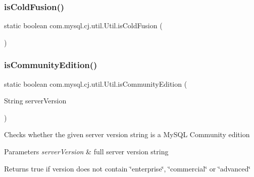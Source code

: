 \subsubsection{\texorpdfstring{is\+Cold\+Fusion()}{isColdFusion()}}
{\footnotesize\ttfamily static boolean com.\+mysql.\+cj.\+util.\+Util.\+is\+Cold\+Fusion (\begin{DoxyParamCaption}{ }\end{DoxyParamCaption})\hspace{0.3cm}{\ttfamily [static]}}

\mbox{\label{classcom_1_1mysql_1_1cj_1_1util_1_1_util_ae6f8c91f805d5d3960a40c0a2892092e}} 
\subsubsection{\texorpdfstring{is\+Community\+Edition()}{isCommunityEdition()}}
{\footnotesize\ttfamily static boolean com.\+mysql.\+cj.\+util.\+Util.\+is\+Community\+Edition (\begin{DoxyParamCaption}\item[{String}]{server\+Version }\end{DoxyParamCaption})\hspace{0.3cm}{\ttfamily [static]}}

Checks whether the given server version string is a My\+S\+QL Community edition


\begin{DoxyParams}{Parameters}
{\em server\+Version} & full server version string \\
\hline
\end{DoxyParams}
\begin{DoxyReturn}{Returns}
true if version does not contain \char`\"{}enterprise\char`\"{}, \char`\"{}commercial\char`\"{} or \char`\"{}advanced\char`\"{} 
\end{DoxyReturn}
\mbox{\label{classcom_1_1mysql_1_1cj_1_1util_1_1_util_a544537a70dee543f33219f1641be7c75}} 
